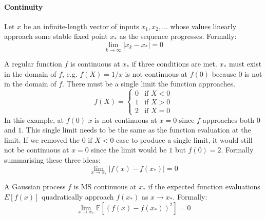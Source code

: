 \paragraph{Continuity}
Let $x$ be an infinite-length vector of inputs $x_1, x_2, ...$ whose values linearly approach some stable fixed point $x_*$ as the sequence progresses. Formally:
\begin{equation*}
    \lim_{k \to \infty} |x_k - x_*| = 0
\end{equation*}

A regular function $f$ is continuous at $x_*$ if three conditions are met. $x_*$ must exist in the domain of $f$, e.g. $f(X) = 1/x$ is not continuous at $f(0)$ because $0$ is not in the domain of $f$. There must be a single limit the function approaches.
\begin{equation*}
    f(X) = \begin{cases}
        0 & \text{if } X < 0 \\
        1 & \text{if } X > 0 \\
        2 & \text{if } X = 0
    \end{cases}
\end{equation*}
In this example, at $f(0)$ $x$ is not continuous at $x = 0$ since $f$ approaches both $0$ and $1$. This single limit needs to be the same as the function evaluation at the limit. If we removed the $0 \text{ if } X < 0$ case to produce a single limit, it would still not be continuous at $x = 0$ since the limit would be $1$ but $f(0) = 2$. Formally summarising these three ideas:
\begin{equation*}
    \lim_{x \to x_*} |f(x) - f(x_*)| = 0
\end{equation*}

A Gaussian process $f$ is MS continuous at $x_*$ if the expected function evaluations $E[f(x)]$ quadratically approach $f(x_*)$ as $x \to x_*$. Formally:
\begin{equation*}
    \lim_{x \to x_*} \mathbb{E}[(f(x) - f(x_*))^2] = 0
\end{equation*}

